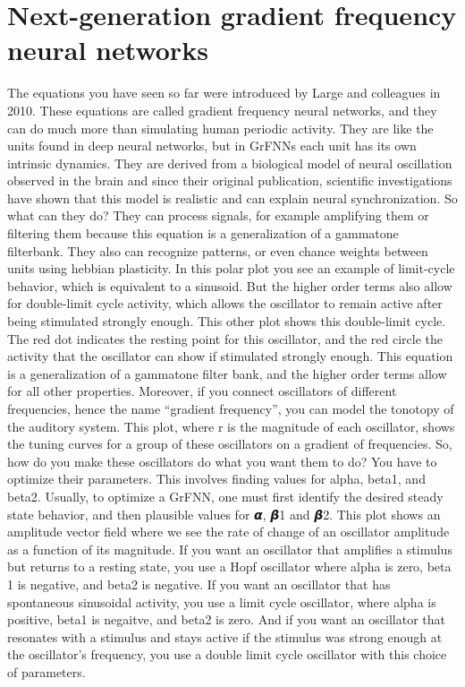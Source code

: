\documentclass{report}
\begin{document}
\chapter{Next-generation gradient frequency neural networks}

The equations you have seen so far were introduced by Large and colleagues in 2010. These equations are called gradient frequency neural networks, and they can do much more than simulating human periodic activity. They are like the units found in deep neural networks, but in GrFNNs each unit has its own intrinsic dynamics. They are derived from a biological model of neural oscillation observed in the brain and since their original publication, scientific investigations have shown that this model is realistic and can explain neural synchronization. So what can they do? They can process signals, for example amplifying them or filtering them because this equation is a generalization of a gammatone filterbank. They also can recognize patterns, or even chance weights between units using hebbian plasticity. In this polar plot you see an example of limit-cycle behavior, which is equivalent to a sinusoid. But the higher order terms also allow for double-limit cycle activity, which allows the oscillator to remain active after being stimulated strongly enough. This other plot shows this double-limit cycle. The red dot indicates the resting point for this oscillator, and the red circle the activity that the oscillator can show if stimulated strongly enough. This equation is a generalization of a gammatone filter bank, and the higher order terms allow for all other properties. Moreover, if you connect oscillators of different frequencies, hence the name “gradient frequency”, you can model the tonotopy of the auditory system. This plot, where r is the magnitude of each oscillator, shows the tuning curves for a group of these oscillators on a gradient of frequencies. 
So, how do you make these oscillators do what you want them to do? You have to optimize their parameters. This involves finding values for alpha, beta1, and beta2. Usually, to optimize a GrFNN, one must first identify the desired steady state behavior, and then plausible values for 𝞪, 𝞫1 and  𝞫2. This plot shows an amplitude vector field where we see the rate of change of an oscillator amplitude as a function of its magnitude. If you want an oscillator that amplifies a stimulus but returns to a resting state, you use a Hopf oscillator where alpha is zero, beta 1 is negative, and beta2 is negative. If you want an oscillator that has spontaneous sinusoidal activity, you use a limit cycle oscillator, where alpha is positive, beta1 is negaitve, and beta2 is zero. And if you want an oscillator that resonates with a stimulus and stays active if the stimulus was strong enough at the oscillator’s frequency, you use a double limit cycle oscillator with this choice of parameters. 
\end{document}
